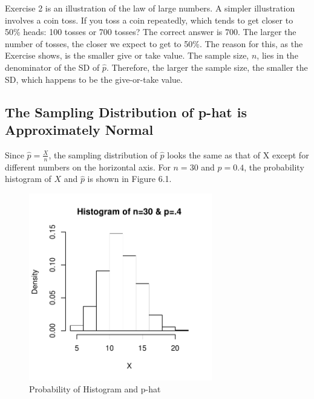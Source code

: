 \documentclass[11pt, chapterprefix=true]{scrbook}\usepackage[]{graphicx}\usepackage[]{color}
\begin{document}
Exercise 2 is an illustration of the law of large numbers.  A simpler illustration involves a coin toss.  If you toss a coin repeatedly, which tends to get closer to 50\% heads: 100 tosses or 700 tosses?  The correct answer is 700.  The larger the number of tosses, the closer we expect to get to 50\%.  The reason for this, as the Exercise shows, is the smaller give or take value.  The sample size, $n$, lies in the denominator of the SD of $\hat{p}$.  Therefore, the larger the sample size, the smaller the SD, which happens to be the give-or-take value.


\subsection{The Sampling Distribution of p-hat is Approximately Normal}

Since $\hat{p} = \frac{X}{n}$, the sampling distribution of $\hat{p}$ looks the same as that of X except for different numbers on the horizontal axis.  For $n = 30$ and $p = 0.4$, the probability histogram of $X$ and $\hat{p}$ is shown in Figure 6.1.

\begin{figure}[ht]

\caption{Probability of Histogram and p-hat}


{\centering \includegraphics[width=8cm]{figure/LBL6a-1} 

}



\end{figure}
\end{document}

